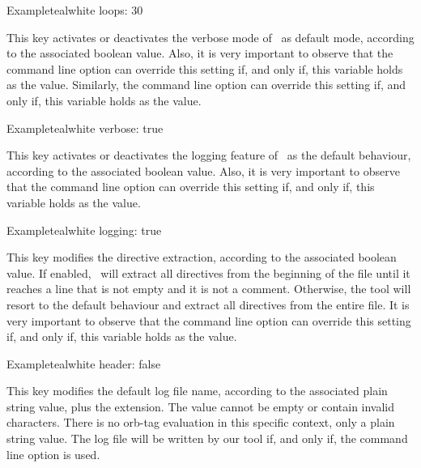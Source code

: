 \begin{description}
\begin{codebox}{Example}{teal}{\icnote}{white}
loops: 30
\end{codebox}

\item[\describecf{O}{boolean}{verbose}{false}] This key activates or deactivates the verbose mode of \arara\ as default mode, according to the associated boolean value. Also, it is very important to observe that the  command line option can override this setting if, and only if, this variable holds  as the value. Similarly, the  command line option can override this setting if, and only if, this variable holds  as the value.

\begin{codebox}{Example}{teal}{\icnote}{white}
verbose: true
\end{codebox}

\item[\describecf{O}{boolean}{logging}{false}] This key activates or deactivates the logging feature of \arara\ as the default behaviour, according to the associated boolean value. Also, it is very important to observe that the  command line option can override this setting if, and only if, this variable holds  as the value.

\begin{codebox}{Example}{teal}{\icnote}{white}
logging: true
\end{codebox}

\item[\describecf{O}{boolean}{header}{false}] This key modifies the directive extraction, according to the associated boolean value. If enabled, \arara\ will extract all directives from the beginning of the file until it reaches a line that is not empty and it is not a comment. Otherwise, the tool will resort to the default behaviour and extract all directives from the entire file. It is very important to observe that the  command line option can override this setting if, and only if, this variable holds  as the value.

\begin{codebox}{Example}{teal}{\icnote}{white}
header: false
\end{codebox}

\item[\describecf{O}{string}{logname}{arara}] This key modifies the default log file name, according to the associated plain string value, plus the  extension. The value cannot be empty or contain invalid characters. There is no \gls{orb-tag} evaluation in this specific context, only a plain string value. The log file will be written by our tool if, and only if, the  command line option is used.


\end{description}
